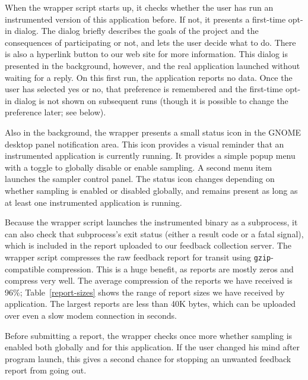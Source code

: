 \documentclass[times,10pt,twocolumn]{article}
\begin{document}
When the wrapper script starts up, it checks whether the user has run
an instrumented version of this application before.  If not, it
presents a first-time opt-in dialog.  The dialog briefly describes the
goals of the project and the consequences of participating or not, and
lets the user decide what to do.  There is also a hyperlink button to
our web site for more information.  This dialog is presented in the
background, however, and the real application launched without waiting
for a reply.  On this first run, the application 
reports no data.  
Once the user has selected yes or no, that preference is
remembered and the first-time opt-in dialog is not shown on subsequent
runs (though it is possible to change the preference later; see below).

Also in the background, the wrapper presents a small status icon in
the GNOME desktop panel notification area.  This icon provides a
visual reminder that an instrumented application is currently running.
It provides a simple popup menu with a toggle to globally disable or
enable sampling.  A second menu item launches the sampler control
panel.  The status icon changes depending on whether sampling is
enabled or disabled globally, and remains present as long as at least
one instrumented application is running.  

Because the wrapper script launches the instrumented binary as a
subprocess, it can also check that subprocess's exit status (either a
result code or a fatal signal), which is included in the report
uploaded to our feedback collection server.
The wrapper script compresses the raw feedback report for transit
using {\tt gzip}-compatible compression.  This is a huge benefit, as reports
are mostly zeros and compress very well.  The average compression
of the reports we have received is 96\%; Table~\ref{report-sizes} shows
the range of report sizes we have received by application.  
The largest reports are less than 40K bytes, which can be uploaded
over even a slow modem connection in seconds.

Before submitting a report, the wrapper checks once more whether
sampling is enabled both globally and for this application.  If the
user changed his mind after program launch, this gives a second chance
for stopping an unwanted feedback report from going out.
\end{document}
